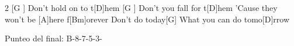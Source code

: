 \begin{guitar}
\begin{multicols}{2}
[G  ]{} Don't hold on to t[D]hem
[G  ]{}  Don't you fall for t[D]hem
'Cause they won't be [A]here \hspace{0.5cm}  f[Bm]orever
Don't do today[G]{}
What you can do tomo[D]rrow
\begin{texttt}
Punteo del final:
B-8-7-5-3-
\end{texttt}
\end{multicols}
\end{guitar}
